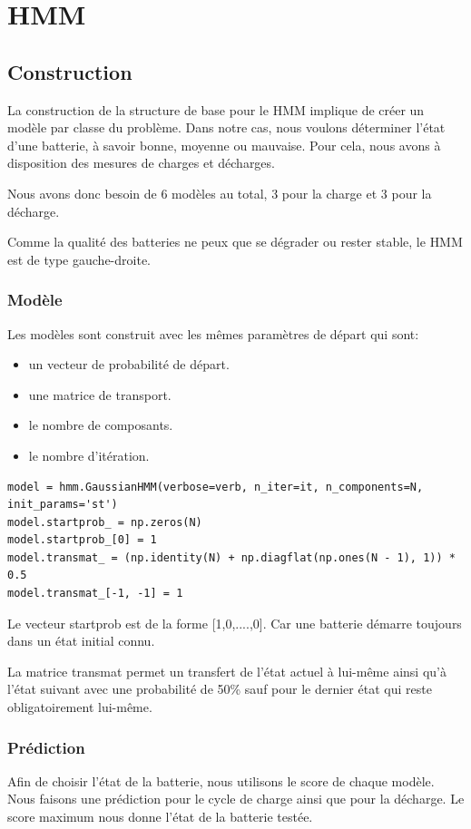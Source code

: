 \chapter{\ac{HMM}}
\section{Construction}
La construction de la structure de base pour le HMM implique de créer un modèle
par classe du problème. Dans notre cas, nous voulons déterminer l'état d'une batterie,
à savoir bonne, moyenne ou mauvaise. Pour cela, nous avons à disposition des mesures
de charges et décharges.

Nous avons donc besoin de 6 modèles au total, 3 pour la charge et 3 pour la décharge.

Comme la qualité des batteries ne peux que se dégrader ou rester stable, le \ac{HMM} est de type gauche-droite.

\subsection{Modèle}
Les modèles sont construit avec les mêmes paramètres de départ qui sont:

\begin{itemize}
    \item un vecteur de probabilité de départ.
    \item une matrice de transport.
    \item le nombre de composants.
    \item le nombre d'itération.
\end{itemize}

\begin{verbatim}
model = hmm.GaussianHMM(verbose=verb, n_iter=it, n_components=N, init_params='st')
model.startprob_ = np.zeros(N)
model.startprob_[0] = 1
model.transmat_ = (np.identity(N) + np.diagflat(np.ones(N - 1), 1)) * 0.5
model.transmat_[-1, -1] = 1
\end{verbatim}
Le vecteur startprob est de la forme [1,0,....,0]. Car une batterie démarre toujours
dans un état initial connu.

La matrice transmat permet un transfert de l'état actuel à lui-même ainsi qu'à
l'état suivant avec une probabilité de 50\% sauf pour le dernier état qui reste
obligatoirement lui-même.

\subsection{Prédiction}
Afin de choisir l'état de la batterie, nous utilisons le score de chaque modèle.
Nous faisons une prédiction pour le cycle de charge ainsi que pour la décharge.
Le score maximum nous donne l'état de la batterie testée.

